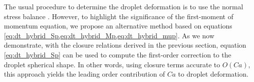 The usual procedure to determine the droplet deformation is to use the normal stress balance \citep{nadim1991motion,nadim1996concise}. 
However, to highlight the significance of the first-moment of momentum equation, we propose an alternative method based on equations \ref{eq:dt_hybrid_Sp,eq:dt_hybrid_Mp,eq:dt_hybrid_mup}. 
As we now demonstrate, with the closure relations derived in the previous section, equation \ref{eq:dt_hybrid_Sp} can be used to compute the first-order correction to the droplet spherical shape. 
In other words, using closure terms accurate to $O(Ca)$, this approach yields the leading order contribution of $Ca$ to droplet deformation.

